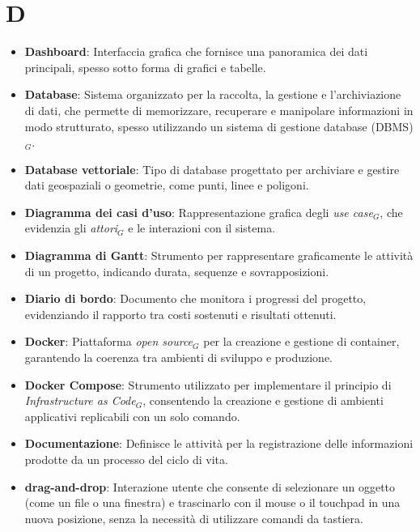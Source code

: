 \section{D}
\begin{itemize}
    \item \textbf{Dashboard}: Interfaccia grafica che fornisce una panoramica dei dati principali, spesso sotto forma di grafici e tabelle.
    \item \textbf{Database}: Sistema organizzato per la raccolta, la gestione e l'archiviazione di dati, che permette di memorizzare, recuperare e manipolare informazioni in modo strutturato, spesso utilizzando un sistema di gestione database (DBMS)$_G$.
    \item \textbf{Database vettoriale}: Tipo di database progettato per archiviare e gestire dati geospaziali o geometrie, come punti, linee e poligoni.
    \item \textbf{Diagramma dei casi d’uso}: Rappresentazione grafica degli \textit{use case}$_G$, che evidenzia gli \textit{attori}$_G$ e le interazioni con il sistema.
    \item \textbf{Diagramma di Gantt}: Strumento per rappresentare graficamente le attività di un progetto, indicando durata, sequenze e sovrapposizioni.
    \item \textbf{Diario di bordo}: Documento che monitora i progressi del progetto, evidenziando il rapporto tra costi sostenuti e risultati ottenuti.
    \item \textbf{Docker}: Piattaforma \textit{open source}$_G$ per la creazione e gestione di container, garantendo la coerenza tra ambienti di sviluppo e produzione.
    \item \textbf{Docker Compose}: Strumento utilizzato per implementare il principio di \textit{Infrastructure as Code}$_G$, consentendo la creazione e gestione di ambienti applicativi replicabili con un solo comando.
    \item \textbf{Documentazione}: Definisce le attività per la registrazione delle informazioni prodotte da un processo del ciclo di vita.
    \item \textbf{drag-and-drop}: Interazione utente che consente di selezionare un oggetto (come un file o una finestra) e trascinarlo con il mouse o il touchpad in una nuova posizione, senza la necessità di utilizzare comandi da tastiera.
\end{itemize}

